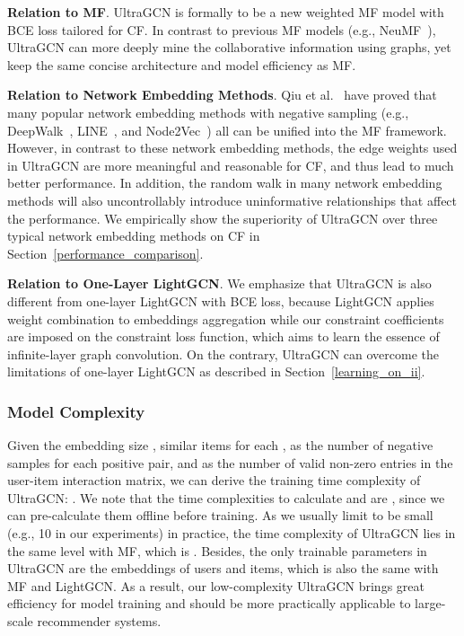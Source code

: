 \documentclass[sigconf,authorversion]{acmart}
\begin{document}
\textbf{Relation to MF}. UltraGCN is formally to be a new weighted MF model with BCE loss tailored for CF. In contrast to previous MF models (e.g., NeuMF~\cite{NeuMF}), UltraGCN can more deeply mine the collaborative information using graphs, yet keep the same concise architecture and model efficiency as MF.

\textbf{Relation to Network Embedding Methods}. Qiu et al.~\cite{unify_network_embedding} have proved that many popular network embedding methods with negative sampling (e.g., DeepWalk~\cite{deepwalk}, LINE~\cite{LINE}, and Node2Vec~\cite{node2vec}) all can be unified into the MF framework. However, in contrast to these network embedding methods, the edge weights used in UltraGCN are more meaningful and reasonable for CF, and thus lead to much better performance. 
In addition, the random walk in many network embedding methods will also uncontrollably introduce uninformative relationships that affect the performance.
We empirically show the superiority of UltraGCN over three typical network embedding methods on CF in Section~\ref{performance_comparison}.

\textbf{Relation to One-Layer LightGCN}. We emphasize that UltraGCN is also different from one-layer LightGCN with BCE loss, because LightGCN applies weight combination to embeddings aggregation while our constraint coefficients are imposed on the constraint loss function, which aims to learn the essence of infinite-layer graph convolution. 
On the contrary, UltraGCN can overcome the limitations of one-layer LightGCN as described in Section~\ref{learning_on_ii}.
 






\subsubsection{Model Complexity}
\label{sec::complexity}
Given the embedding size ,  similar items for each ,  as the number of negative samples for each positive pair, and  as the number of valid non-zero entries in the user-item interaction matrix, we can derive the training time complexity of UltraGCN: . We note that the time complexities to calculate  and  are  , since we can pre-calculate them offline before training. As we usually limit  to be small (e.g., 10 in our experiments) in practice, the time complexity of UltraGCN lies in the same level with MF, which is . Besides, the only trainable parameters in UltraGCN are the embeddings of users and items, which is also the same with MF and LightGCN. As a result, our low-complexity UltraGCN brings great efficiency for model training and should be more practically applicable to large-scale recommender systems.
\end{document}
